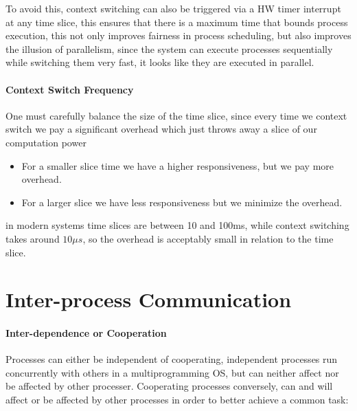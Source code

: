 \documentclass[openright, twoside]{report}
\theoremstyle{definition}
\theoremstyle{example}
\begin{document}
				To avoid this, context switching can also be triggered via a HW timer interrupt at any time slice,
				this ensures that there is a maximum time that bounds process execution, this not only improves
				fairness in process scheduling, but also improves the illusion of parallelism, since the 
				system can execute processes sequentially while switching them very fast, it looks like they are
				executed in parallel.

			\paragraph{Context Switch Frequency}
			\label{par:t_perf}
				One must carefully balance the size of the time slice, since every time we context switch 
				we pay a significant overhead which just throws away a slice of our computation power 
				
				\begin{itemize}
					\item For a smaller slice time we have a higher responsiveness, but we pay more overhead.
					\item For a larger slice we have less responsiveness but we minimize the overhead.
				\end{itemize}

				in modern systems time slices are between 10 and 100ms, while context switching takes
				around $10\mu s$, so the overhead is acceptably small in relation to the time slice.

	\section{Inter-process Communication}
			\paragraph{Inter-dependence or Cooperation}
				Processes can either be independent of cooperating, independent processes run
				concurrently with others in a multiprogramming OS, but can neither affect nor
				be affected by other processer. 
				Cooperating processes conversely, can and will affect or be affected by other
				processes in order to better achieve a common task:
\end{document}

